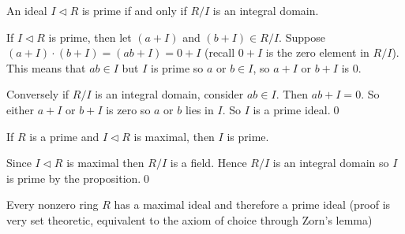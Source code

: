 \documentclass{article}
\newcommand{\nrm}{\triangleleft}
\begin{document}
\begin{proposition}
  An ideal $ I\nrm R$ is prime if and only if $ R/I $ is an integral domain.
\end{proposition}
\pf If $ I \nrm R $ is prime, then let $ (a+I) $ and $ (b+I)\in R/I $. Suppose $ (a+I)\cdot(b+I)=(ab+I)=0+I $ (recall $ 0+I $ is the zero element in $ R/I $). This means that $ ab\in I $ but $ I $ is prime so $ a $ or $ b\in I $, so $ a+I $ or $ b+I $ is $ 0 $.\par
Conversely if $ R/I $ is an integral domain, consider $ ab\in I $. Then $ ab + I = 0 $. So either $ a+I $ or $ b+I $ is zero so $ a $ or $ b $ lies in $ I $. So $ I $ is a prime ideal.\qed

\begin{corollary}
  If $ R $ is a prime and $ I\nrm R $ is maximal, then $ I $ is prime.
\end{corollary}
\pf Since $ I\nrm R $ is maximal then $ R/I $ is a field. Hence $ R/I $ is an integral domain so $ I $ is prime by the proposition.\qed\par
Every nonzero ring $ R $ has a maximal ideal and therefore a prime ideal (proof is very set theoretic, equivalent to the axiom of choice through Zorn's lemma)
\end{document}
